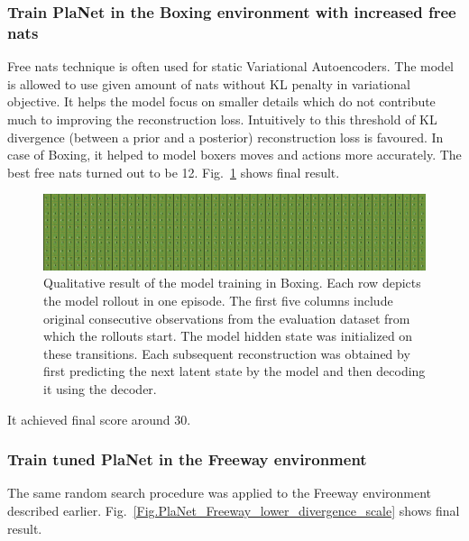 \subsubsection{Train PlaNet in the Boxing environment with increased free nats}

Free nats technique is often used for static Variational Autoencoders. The model is allowed to use given amount of nats without KL penalty in variational objective. It helps the model focus on smaller details which do not contribute much to improving the reconstruction loss. Intuitively to this threshold of KL divergence (between a prior and a posterior) reconstruction loss is favoured. In case of Boxing, it helped to model boxers moves and actions more accurately. The best free nats turned out to be 12. Fig.~\ref{Fig.PlaNet_Boxing_lower_divergence_scale} shows final result.

\begin{figure}[H]
\includegraphics[width=1\textwidth,keepaspectratio]{figures/PlaNet/Boxing_memory_sharp.png}
\caption[Qualitative result of the PlaNet model training with a lower divergence scale in Boxing]{Qualitative result of the model training in Boxing. Each row depicts the model rollout in one episode. The first five columns include original consecutive observations from the evaluation dataset from which the rollouts start. The model hidden state was initialized on these transitions. Each subsequent reconstruction was obtained by first predicting the next latent state by the model and then decoding it using the decoder.}
\label{Fig.PlaNet_Boxing_lower_divergence_scale}
\end{figure}

It achieved final score around 30. 

\subsubsection{Train tuned PlaNet in the Freeway environment}

The same random search procedure was applied to the Freeway environment described earlier. Fig.~\ref{Fig.PlaNet_Freeway_lower_divergence_scale} shows final result.

